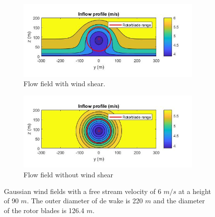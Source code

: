 \begin{figure}
	\centering
	\begin{subfigure}[b]{0.50\textwidth}
		\includegraphics[width=\linewidth]{./Figures/PlotwithshearU6D220.png} %
		\caption{Flow field with wind shear.}
		\label{fig:windsh}
	\end{subfigure}
	
	\begin{subfigure}[b]{0.50\textwidth}
		\includegraphics[width=\linewidth]{./Figures/PlotwithoutshearU6D220.png} %
		\caption{Flow field without wind shear}
		\label{fig:nowindsh}
	\end{subfigure}
	
	\caption[Two Gaussian flow fields]{Gaussian wind fields with a free stream velocity of 6 $m/s$ at a height of 90 $m$. The outer diameter of de wake is 220 $m$ and the diameter of the rotor blades is 126.4 $m$.}
	\label{fig:windshear}
\end{figure}

